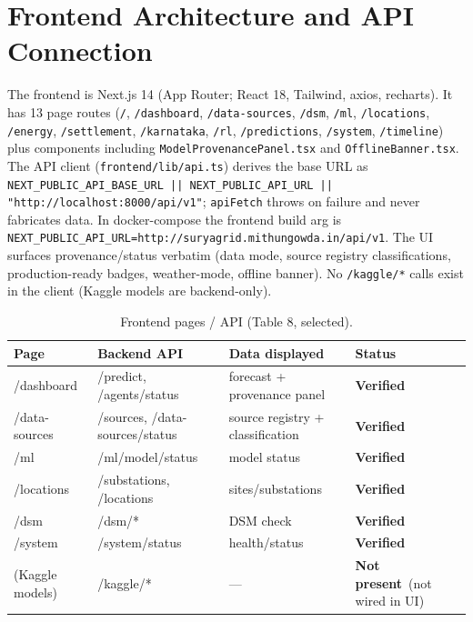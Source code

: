 \documentclass[11pt,a4paper]{article}
\newcommand{\stV}{\textcolor{cok}{\textbf{Verified}}}
\newcommand{\stNP}{\textcolor{cmiss}{\textbf{Not present}}}
\newcommand{\code}[1]{\texttt{\small #1}}
\begin{document}
\section{Frontend Architecture and API Connection}
The frontend is Next.js 14 (App Router; React 18, Tailwind, axios, recharts). It has 13
page routes (\code{/}, \code{/dashboard}, \code{/data-sources}, \code{/dsm}, \code{/ml},
\code{/locations}, \code{/energy}, \code{/settlement}, \code{/karnataka}, \code{/rl},
\code{/predictions}, \code{/system}, \code{/timeline}) plus components including
\code{ModelProvenancePanel.tsx} and \code{OfflineBanner.tsx}. The API client
(\code{frontend/lib/api.ts}) derives the base URL as
\code{NEXT\_PUBLIC\_API\_BASE\_URL || NEXT\_PUBLIC\_API\_URL || "http://localhost:8000/api/v1"};
\code{apiFetch} throws on failure and never fabricates data. In docker-compose the frontend
build arg is \code{NEXT\_PUBLIC\_API\_URL=http://suryagrid.mithungowda.in/api/v1}. The UI
surfaces provenance/status verbatim (data mode, source registry classifications,
production-ready badges, weather-mode, offline banner). No \code{/kaggle/*} calls exist in
the client (Kaggle models are backend-only).

\begin{table}[H]\centering\footnotesize
\caption{Frontend pages / API (Table 8, selected).}\label{tab:fe}
\begin{tabular}{@{}p{2.4cm}p{2.6cm}p{3.4cm}l@{}}
\toprule
\textbf{Page} & \textbf{Backend API} & \textbf{Data displayed} & \textbf{Status}\\
\midrule
/dashboard & /predict, /agents/status & forecast + provenance panel & \stV\\
/data-sources & /sources, /data-sources/status & source registry + classification & \stV\\
/ml & /ml/model/status & model status & \stV\\
/locations & /substations, /locations & sites/substations & \stV\\
/dsm & /dsm/* & DSM check & \stV\\
/system & /system/status & health/status & \stV\\
(Kaggle models) & /kaggle/* & --- & \stNP\ (not wired in UI)\\
\bottomrule
\end{tabular}
\end{table}
\end{document}
